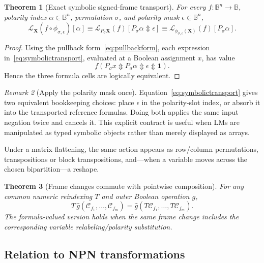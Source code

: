\documentclass[11pt]{article}
\newtheorem{theorem}{Theorem}[section]
\theoremstyle{definition}
\theoremstyle{remark}
\newtheorem{remark}[theorem]{Remark}
\newcommand{\B}{\mathbb B}
\newcommand{\cC}{\mathcal C}
\newcommand{\xor}{\mathbin{\Updownarrow}}
\begin{document}
\begin{theorem}[Exact symbolic signed-frame transport]
\label{thm:symbolictransport}
For every $f:\B^n\to\B$, polarity index $\alpha\in\B^n$, permutation $\sigma$, and polarity mask $\epsilon\in\B^n$,
\begin{equation}
 \boxed{
 \mathcal L_{\mathbf X}(f\circ\phi_{\sigma,\epsilon})[\alpha]
 \equiv
 \mathcal L_{P_\sigma\mathbf X}(f)
       [P_\sigma\alpha\xor\epsilon]
 \equiv
 \mathcal L_{\phi_{\sigma,\epsilon}(\mathbf X)}(f)
       [P_\sigma\alpha].}
 \label{eq:symbolictransport}
\end{equation}
\end{theorem}
\begin{proof}
Using the pullback form~\eqref{eq:pullbackform}, each expression in~\eqref{eq:symbolictransport}, evaluated at a Boolean assignment $x$, has value
\[
 f\!\left(P_\sigma x\xor P_\sigma\alpha\xor\epsilon\xor\mathbf1\right).
\]
Hence the three formula cells are logically equivalent.
\end{proof}

\begin{remark}[Apply the polarity mask once]
Equation~\eqref{eq:symbolictransport} gives two equivalent bookkeeping choices: place $\epsilon$ in the polarity-slot index, or absorb it into the transported reference formulas.  Doing both applies the same input negation twice and cancels it.  This explicit contract is useful when LMs are manipulated as typed symbolic objects rather than merely displayed as arrays.
\end{remark}

Under a matrix flattening, the same action appears as row/column permutations, transpositions or block transpositions, and---when a variable moves across the chosen bipartition---a reshape.

\begin{theorem}[Frame changes commute with pointwise composition]
For any common numeric reindexing $T$ and outer Boolean operation $g$,
\begin{equation}
 T\,\widehat g(\cC_{f_1},\ldots,\cC_{f_m})
 =\widehat g(T\cC_{f_1},\ldots,T\cC_{f_m}).
 \label{eq:framecommutes}
\end{equation}
The formula-valued version holds when the same frame change includes the corresponding variable relabeling/polarity substitution.
\end{theorem}

\subsection{Relation to NPN transformations}
\end{document}
